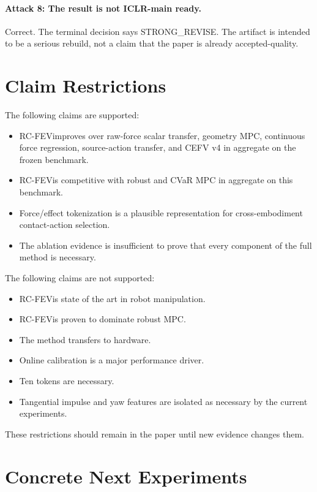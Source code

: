 \documentclass{article}
\newcommand{\method}{RC-FEV}
\begin{document}
\paragraph{Attack 8: The result is not ICLR-main ready.}
Correct. The terminal decision says STRONG\_REVISE. The artifact is intended to be a serious rebuild, not a claim that the paper is already accepted-quality.

\section{Claim Restrictions}

The following claims are supported:

\begin{itemize}
\item \method improves over raw-force scalar transfer, geometry MPC, continuous force regression, source-action transfer, and CEFV v4 in aggregate on the frozen benchmark.
\item \method is competitive with robust and CVaR MPC in aggregate on this benchmark.
\item Force/effect tokenization is a plausible representation for cross-embodiment contact-action selection.
\item The ablation evidence is insufficient to prove that every component of the full method is necessary.
\end{itemize}

The following claims are not supported:

\begin{itemize}
\item \method is state of the art in robot manipulation.
\item \method is proven to dominate robust MPC.
\item The method transfers to hardware.
\item Online calibration is a major performance driver.
\item Ten tokens are necessary.
\item Tangential impulse and yaw features are isolated as necessary by the current experiments.
\end{itemize}

These restrictions should remain in the paper until new evidence changes them.

\section{Concrete Next Experiments}
\end{document}
